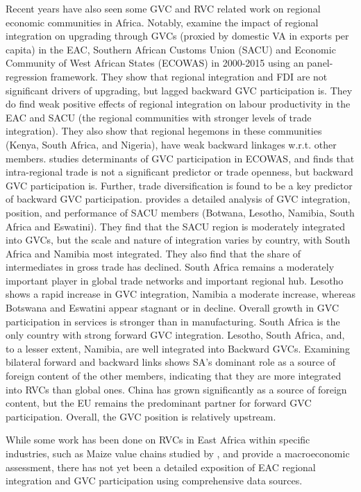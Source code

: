 \documentclass[a4paper]{article}
\begin{document}
Recent years have also seen some GVC and RVC related work on regional economic communities in Africa. Notably, \citet{obasaju2021regional} examine the impact of regional integration on upgrading through GVCs (proxied by domestic VA in exports per capita) in the EAC, Southern African Customs Union (SACU) and Economic Community of West African States (ECOWAS) in 2000-2015 using an panel-regression framework. They show that regional integration and FDI are not significant drivers of upgrading, but lagged backward GVC participation is. They do find weak positive effects of regional integration on labour productivity in the EAC and SACU (the regional communities with stronger levels of trade integration). They also show that regional hegemons in these communities (Kenya, South Africa, and Nigeria), have weak backward linkages w.r.t. other members. \citet{tinta2017determinants} studies determinants of GVC participation in ECOWAS, and finds that intra-regional trade is not a significant predictor or trade openness, but backward GVC participation is. Further, trade diversification is found to be a key predictor of backward GVC participation. \citet{engel2016sacu} provides a detailed analysis of GVC integration, position, and performance of SACU members (Botwana, Lesotho, Namibia, South Africa and Eswatini). They find that the SACU region is moderately integrated into GVCs, but the scale and nature of integration varies by country, with South Africa and Namibia most integrated. They also find that  the share of intermediates in gross trade has declined. South Africa remains a moderately important player in global trade networks and important regional hub. Lesotho shows a rapid increase in GVC integration, Namibia a moderate increase, whereas Botswana and Eswatini appear stagnant or in decline. Overall growth in GVC participation in services is stronger than in manufacturing.  South Africa is the only country with strong forward GVC integration. Lesotho, South Africa, and, to a lesser extent, Namibia, are well integrated into Backward GVCs. Examining bilateral forward and backward links shows SA's dominant role as a source of foreign content of the other members, indicating that they are more integrated into RVCs than global ones. China has grown significantly as a source of foreign content, but the EU remains the predominant partner for forward GVC participation. Overall, the GVC position is relatively upstream. 
 \newline 

While some work has been done on RVCs in East Africa within specific industries, such as Maize value chains studied by \citet{daly2016maize}, and \citet{lwesya2022integration} provide a macroeconomic assessment, there has not yet been a detailed exposition of EAC regional integration and GVC participation using comprehensive data sources. \newline %
\end{document}
